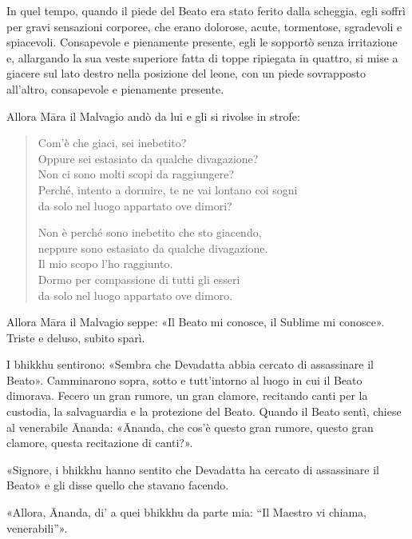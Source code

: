 

 In quel tempo, quando il piede del Beato era stato ferito
dalla scheggia, egli soffrì per gravi sensazioni corporee, che erano
dolorose, acute, tormentose, sgradevoli e spiacevoli. Consapevole e
pienamente presente, egli le sopportò senza irritazione e, allargando la
sua veste superiore fatta di toppe ripiegata in quattro, si mise a
giacere sul lato destro nella posizione del leone, con un piede
sovrapposto all’altro, consapevole e pienamente presente.


Allora Māra il Malvagio andò da lui e gli si rivolse in strofe:


\begin{quote}
Com’è che giaci, sei inebetito? \\
Oppure sei estasiato da qualche divagazione? \\
Non ci sono molti scopi da raggiungere? \\
Perché, intento a dormire, te ne vai lontano coi sogni \\
da solo nel luogo appartato ove dimori?


Non è perché sono inebetito che sto giacendo, \\
neppure sono estasiato da qualche divagazione. \\
Il mio scopo l’ho raggiunto. \\
Dormo per compassione di tutti gli esseri \\
da solo nel luogo appartato ove dimoro.
\end{quote}

Allora Māra il Malvagio seppe: «Il Beato mi conosce, il Sublime mi
conosce». Triste e deluso, subito sparì.




 I bhikkhu sentirono: «Sembra che Devadatta abbia cercato
di assassinare il Beato». Camminarono sopra, sotto e tutt’intorno al
luogo in cui il Beato dimorava. Fecero un gran rumore, un gran clamore,
recitando canti per la custodia, la salvaguardia e la protezione del
Beato. Quando il Beato sentì, chiese al venerabile Ānanda: «Ānanda, che
cos’è questo gran rumore, questo gran clamore, questa recitazione di
canti?».


«Signore, i bhikkhu hanno sentito che Devadatta ha cercato di
assassinare il Beato» e gli disse quello che stavano facendo.


«Allora, Ānanda, di' a quei bhikkhu da parte mia: “Il Maestro vi chiama,
venerabili”».


